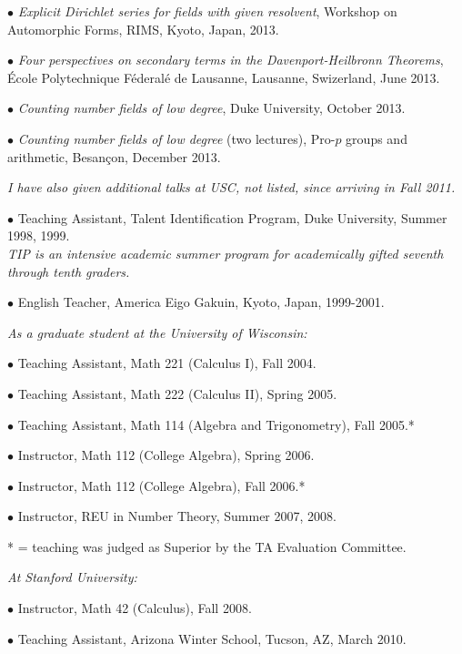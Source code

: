 \documentclass{article}
\newcommand{\categorywidth}{1in}        %
\newcommand{\infowidth}{5.8in}          %
\newcommand{\categorysep}{5pt}
\newcommand{\catlistlabel}[1]%
{\raisebox{0pt}[1ex][0pt]{\makebox[\labelwidth][l]%
    {\parbox[t]{\labelwidth}{\hspace{0pt}\textbf{#1}}}}}
\newenvironment{categories}{\begin{list}{}{
      \setlength{\labelwidth}{\categorywidth}
      \setlength{\leftmargin}{\labelwidth}
      \addtolength{\leftmargin}{\labelsep}
      \setlength{\topsep}{20pt}
      \setlength{\itemsep}{\categorysep}
      \renewcommand{\makelabel}{\catlistlabel}
      }}{\end{list}}
\newcommand{\category}[1]{\item[#1]}
\newcommand{\rawentry}[1]{{\begin{minipage}[t]{\infowidth}{#1}
    \end{minipage}}}
\begin{document}
\begin{flushleft}
\begin{categories}
$\bullet$ {\itshape Explicit Dirichlet series for fields with given resolvent},
Workshop on Automorphic Forms, RIMS, Kyoto, Japan, 2013.

$\bullet$ {\itshape Four perspectives on secondary terms in the Davenport-Heilbronn Theorems},
\'Ecole Polytechnique F\'ederal\'e de Lausanne, Lausanne, Swizerland, June 2013.

$\bullet$ {\itshape Counting number fields of low degree},
Duke University, October 2013.

$\bullet$ {\itshape Counting number fields of low degree} (two lectures),
Pro-$p$ groups and arithmetic, Besan\c{c}on, December 2013.

\rawentry{\itshape I have also given additional talks at USC, not listed, 
since arriving in Fall 2011.}

  \category{Teaching \\ Experience}

  $\bullet$ {Teaching Assistant, Talent Identification Program, Duke University, Summer 1998, 1999. \\
  \itshape TIP is an intensive academic summer program for academically gifted seventh through
tenth graders. \upshape}

  $\bullet$ {English Teacher, America Eigo Gakuin, Kyoto, Japan, 1999-2001.}

  \rawentry{\itshape As a graduate student at the University of Wisconsin:}

  $\bullet$ {Teaching Assistant, Math 221 (Calculus I), Fall 2004.}

  $\bullet$ {Teaching Assistant, Math 222 (Calculus II), Spring 2005.}

  $\bullet$ {Teaching Assistant, Math 114 (Algebra and Trigonometry), Fall 2005.*}

  $\bullet$ {Instructor, Math 112 (College Algebra), Spring 2006.}

  $\bullet$ {Instructor, Math 112 (College Algebra), Fall 2006.* }

  $\bullet$ {Instructor, REU in Number Theory, Summer 2007, 2008.}

  \rawentry{* = teaching was judged as Superior by the TA Evaluation Committee.}

  \rawentry{\itshape At Stanford University:}

  $\bullet$ {Instructor, Math 42 (Calculus), Fall 2008.}

  $\bullet$ {Teaching Assistant, Arizona Winter School, Tucson, AZ, March 2010.}


\end{categories}
\end{flushleft}
\end{document}
